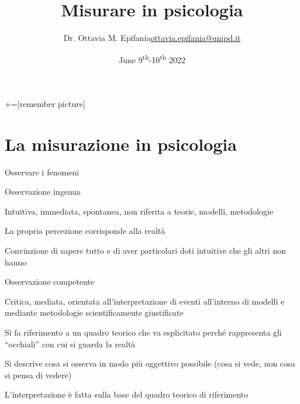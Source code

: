 \documentclass[compress]{beamer}
\title[Misura in $\psi$]{Misurare in psicologia}
\date{June 9\textsuperscript{th}-10\textsuperscript{th} 2022}
\institute{University of Padova}
\author[Ottavia Epifania]{\texorpdfstring{Dr. Ottavia M. Epifania\newline\url{ottavia.epifania@unipd.it}}{Author}}
\begin{document}
	+=[remember picture]
	
	


\begin{frame}[plain]
    \maketitle
\end{frame}
\begin{frame}{}
	\small
	\tableofcontents
\end{frame}

\section[Misura]{La misurazione in psicologia}

\begin{frame}{Osservare i fenomeni}
	\begin{block}{Osservazione ingenua}
		
		Intuitiva, immediata, spontanea, non riferita a teorie, modelli, metodologie
		
		La propria percezione corrisponde alla realtà
		
		Convinzione di sapere tutto e di aver particolari doti intuitive che gli altri non hanno
	\end{block}
	
	\pause
	\begin{block}{Osservazione competente}
		
		Critica, mediata, orientata all’interpretazione di eventi all’interno di modelli e mediante metodologie scientificamente giustificate
		
		Si fa riferimento a un quadro teorico che va esplicitato perché rappresenta gli ``occhiali'' con cui si guarda la realtà
		
		Si descrive cosa si osserva in modo più oggettivo possibile (cosa si vede, non cosa si pensa di vedere)
		
		L'interpretazione è fatta sulla base del quadro teorico di riferimento
	\end{block}
\end{frame}
\end{document}
